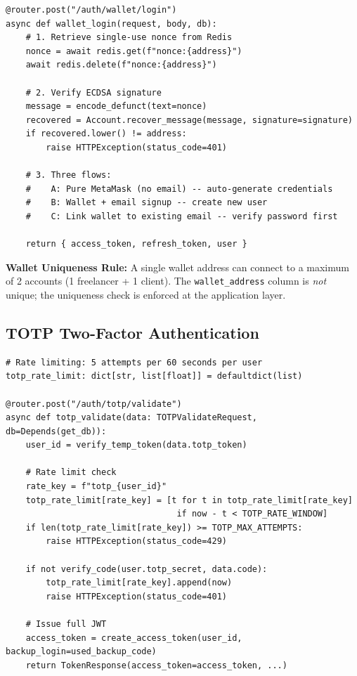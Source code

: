 \documentclass[12pt,a4paper]{article}
\begin{document}
\begin{lstlisting}[style=pythonstyle]
@router.post("/auth/wallet/login")
async def wallet_login(request, body, db):
    # 1. Retrieve single-use nonce from Redis
    nonce = await redis.get(f"nonce:{address}")
    await redis.delete(f"nonce:{address}")

    # 2. Verify ECDSA signature
    message = encode_defunct(text=nonce)
    recovered = Account.recover_message(message, signature=signature)
    if recovered.lower() != address:
        raise HTTPException(status_code=401)

    # 3. Three flows:
    #    A: Pure MetaMask (no email) -- auto-generate credentials
    #    B: Wallet + email signup -- create new user
    #    C: Link wallet to existing email -- verify password first

    return { access_token, refresh_token, user }
\end{lstlisting}

\textbf{Wallet Uniqueness Rule:} A single wallet address can connect to a maximum of 2 accounts (1 freelancer + 1 client). The \texttt{wallet\_address} column is \emph{not} unique; the uniqueness check is enforced at the application layer.

\subsection{TOTP Two-Factor Authentication}

\begin{lstlisting}[style=pythonstyle]
# Rate limiting: 5 attempts per 60 seconds per user
totp_rate_limit: dict[str, list[float]] = defaultdict(list)

@router.post("/auth/totp/validate")
async def totp_validate(data: TOTPValidateRequest, db=Depends(get_db)):
    user_id = verify_temp_token(data.totp_token)

    # Rate limit check
    rate_key = f"totp_{user_id}"
    totp_rate_limit[rate_key] = [t for t in totp_rate_limit[rate_key]
                                  if now - t < TOTP_RATE_WINDOW]
    if len(totp_rate_limit[rate_key]) >= TOTP_MAX_ATTEMPTS:
        raise HTTPException(status_code=429)

    if not verify_code(user.totp_secret, data.code):
        totp_rate_limit[rate_key].append(now)
        raise HTTPException(status_code=401)

    # Issue full JWT
    access_token = create_access_token(user_id, backup_login=used_backup_code)
    return TokenResponse(access_token=access_token, ...)
\end{lstlisting}
\end{document}
